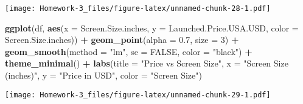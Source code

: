 \documentclass[
]{article}
\newenvironment{Shaded}{\begin{snugshade}}{\end{snugshade}}
\newcommand{\AttributeTok}[1]{\textcolor[rgb]{0.13,0.29,0.53}{#1}}
\newcommand{\ConstantTok}[1]{\textcolor[rgb]{0.56,0.35,0.01}{#1}}
\newcommand{\DecValTok}[1]{\textcolor[rgb]{0.00,0.00,0.81}{#1}}
\newcommand{\FloatTok}[1]{\textcolor[rgb]{0.00,0.00,0.81}{#1}}
\newcommand{\FunctionTok}[1]{\textcolor[rgb]{0.13,0.29,0.53}{\textbf{#1}}}
\newcommand{\NormalTok}[1]{#1}
\newcommand{\SpecialCharTok}[1]{\textcolor[rgb]{0.81,0.36,0.00}{\textbf{#1}}}
\newcommand{\StringTok}[1]{\textcolor[rgb]{0.31,0.60,0.02}{#1}}
\begin{document}
\texttt{[image: Homework-3\_files/figure-latex/unnamed-chunk-28-1.pdf]}

\begin{Shaded}
\begin{Highlighting}[]
\FunctionTok{ggplot}\NormalTok{(df, }\FunctionTok{aes}\NormalTok{(}\AttributeTok{x =}\NormalTok{ Screen.Size.inches, }\AttributeTok{y =}\NormalTok{ Launched.Price.USA.USD, }\AttributeTok{color =}\NormalTok{ Screen.Size.inches)) }\SpecialCharTok{+}
  \FunctionTok{geom\_point}\NormalTok{(}\AttributeTok{alpha =} \FloatTok{0.7}\NormalTok{, }\AttributeTok{size =} \DecValTok{3}\NormalTok{) }\SpecialCharTok{+}
  \FunctionTok{geom\_smooth}\NormalTok{(}\AttributeTok{method =} \StringTok{"lm"}\NormalTok{, }\AttributeTok{se =} \ConstantTok{FALSE}\NormalTok{, }\AttributeTok{color =} \StringTok{"black"}\NormalTok{) }\SpecialCharTok{+}
  \FunctionTok{theme\_minimal}\NormalTok{() }\SpecialCharTok{+}
  \FunctionTok{labs}\NormalTok{(}\AttributeTok{title =} \StringTok{"Price vs Screen Size"}\NormalTok{,}
       \AttributeTok{x =} \StringTok{"Screen Size (inches)"}\NormalTok{,}
       \AttributeTok{y =} \StringTok{"Price in USD"}\NormalTok{,}
       \AttributeTok{color =} \StringTok{"Screen Size"}\NormalTok{)}
\end{Highlighting}
\end{Shaded}

\texttt{[image: Homework-3\_files/figure-latex/unnamed-chunk-29-1.pdf]}
\end{document}
